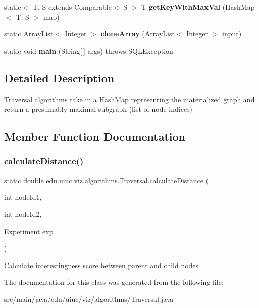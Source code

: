 \begin{DoxyCompactItemize}
static$<$ T, S extends Comparable$<$ S $>$ T {\bfseries get\+Key\+With\+Max\+Val} (Hash\+Map$<$ T, S $>$ map)
\item 
\mbox{\label{classedu_1_1uiuc_1_1viz_1_1algorithms_1_1_traversal_ac100a765c8b760d6b8b75318d260373a}} 
static Array\+List$<$ Integer $>$ {\bfseries clone\+Array} (Array\+List$<$ Integer $>$ input)
\item 
\mbox{\label{classedu_1_1uiuc_1_1viz_1_1algorithms_1_1_traversal_a359c4927195b0fce9b9a1af4372906aa}} 
static void {\bfseries main} (String\mbox{[}$\,$\mbox{]} args)  throws S\+Q\+L\+Exception      
\end{DoxyCompactItemize}


\subsection{Detailed Description}
\mbox{\hyperlink{classedu_1_1uiuc_1_1viz_1_1algorithms_1_1_traversal}{Traversal}} algorithms take in a Hash\+Map representing the materialized graph and return a presumably maximal subgraph (list of node indices) 

\subsection{Member Function Documentation}
\mbox{\label{classedu_1_1uiuc_1_1viz_1_1algorithms_1_1_traversal_ab7a9795c9eafec00f2ff2ba5a099deeb}} 
\subsubsection{\texorpdfstring{calculateDistance()}{calculateDistance()}}
{\footnotesize\ttfamily static double edu.\+uiuc.\+viz.\+algorithms.\+Traversal.\+calculate\+Distance (\begin{DoxyParamCaption}\item[{int}]{node\+Id1,  }\item[{int}]{node\+Id2,  }\item[{\mbox{\hyperlink{classedu_1_1uiuc_1_1viz_1_1algorithms_1_1_experiment}{Experiment}}}]{exp }\end{DoxyParamCaption})\hspace{0.3cm}{\ttfamily [static]}}

Calculate interestingness score between parent and child nodes 

The documentation for this class was generated from the following file\+:\begin{DoxyCompactItemize}
\item 
src/main/java/edu/uiuc/viz/algorithms/Traversal.\+java\end{DoxyCompactItemize}
